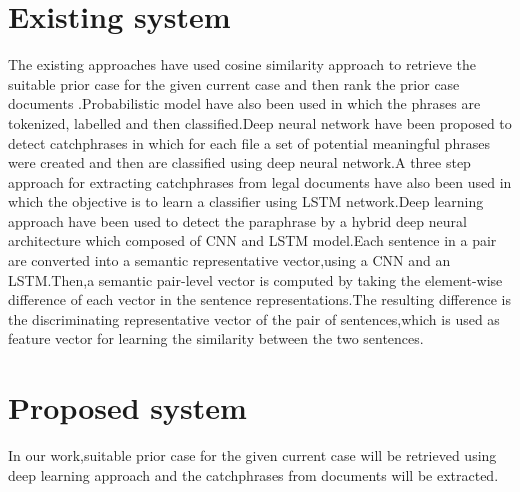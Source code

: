 \documentclass[12pt,a4paper]{article}
\begin{document}
\section{Existing system}
The existing approaches have used cosine similarity approach to retrieve the suitable prior case for the given current case and then rank the prior case documents\cite{reshma2017distributed} \cite{thenmozhi2017text}.Probabilistic model have also been used in which the phrases are tokenized, labelled and then classified\cite{kulkarni2017detection}.Deep neural network have been proposed to detect catchphrases in which for each file a set of potential meaningful phrases were created and then are classified using deep neural network\cite{das2017catch}.A three step approach for extracting catchphrases from legal documents have also been used in which the objective is to learn a classifier using LSTM network\cite{bhargava2017catchphrase}.Deep learning approach have been used to detect the paraphrase by a hybrid deep neural architecture which composed of CNN and LSTM model.Each sentence in a pair are converted into a semantic representative vector,using a CNN and an LSTM.Then,a semantic pair-level vector is computed by taking the element-wise difference of each vector in the sentence representations.The resulting difference is the discriminating representative vector of the pair of sentences,which is used as feature vector for learning the similarity between the two sentences\cite{agarwal2017deep}.

\section{Proposed system}
 In our work,suitable prior case for the given current case will be retrieved using deep learning approach and the catchphrases from documents will be extracted.   
\end{document}
